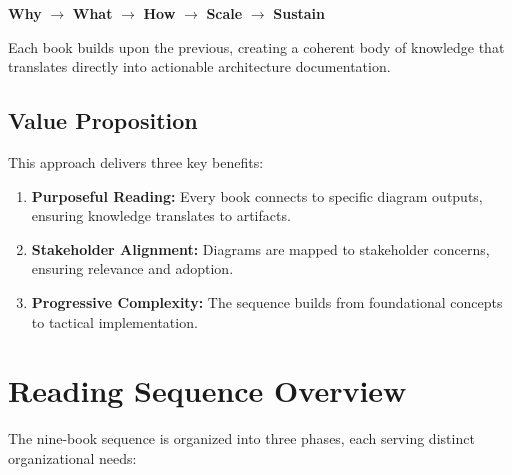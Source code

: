 \documentclass[11pt,letterpaper]{article}
\begin{document}
\begin{center}
\begin{tcolorbox}[
    colback=lightblue,
    colframe=accentblue,
    width=0.95\textwidth,
    arc=3pt
]
\centering
\large
\textbf{Why} $\rightarrow$ \textbf{What} $\rightarrow$ \textbf{How} $\rightarrow$ \textbf{Scale} $\rightarrow$ \textbf{Sustain}
\end{tcolorbox}
\end{center}

Each book builds upon the previous, creating a coherent body of knowledge that translates directly into actionable architecture documentation.

\subsection{Value Proposition}

This approach delivers three key benefits:

\begin{enumerate}[nosep]
    \item \textbf{Purposeful Reading:} Every book connects to specific diagram outputs, ensuring knowledge translates to artifacts.
    \item \textbf{Stakeholder Alignment:} Diagrams are mapped to stakeholder concerns, ensuring relevance and adoption.
    \item \textbf{Progressive Complexity:} The sequence builds from foundational concepts to tactical implementation.
\end{enumerate}

\newpage

\section{Reading Sequence Overview}

The nine-book sequence is organized into three phases, each serving distinct organizational needs:
\end{document}
